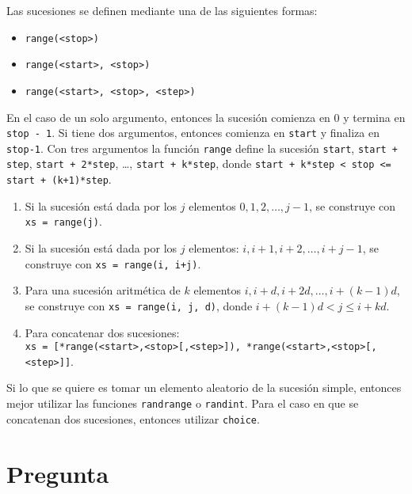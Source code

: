 \documentclass[12pt]{article}
\theoremstyle{definition}
\begin{document}
Las sucesiones se definen mediante una de las siguientes formas:
\begin{itemize}
  \item \verb|range(<stop>)|
  \item \verb|range(<start>, <stop>)|
  \item \verb|range(<start>, <stop>, <step>)|
\end{itemize}

En el caso de un solo argumento, entonces la sucesión comienza en 0 y termina en \verb|stop - 1|. Si tiene dos argumentos, entonces comienza en \verb|start| y finaliza en \verb|stop-1|. Con tres argumentos la función \verb|range| define la sucesión \verb|start|, \verb|start + step|, \verb|start + 2*step|, \dots, \verb|start + k*step|, donde \verb|start + k*step < stop <= start + (k+1)*step|.

\begin{enumerate}
  \item Si la sucesión está dada por los $j$ elementos $0, 1, 2, \dots, j - 1$, se construye con \verb|xs = range(j)|.
  \item Si la sucesión está dada por los $j$ elementos: $i, i+1, i+2, \dots, i + j - 1$, se construye con \verb|xs = range(i, i+j)|.
  \item Para una sucesión aritmética de $k$ elementos $i, i + d, i + 2d, \dots, i + (k-1)d$, se construye con \verb|xs = range(i, j, d)|, donde $i + (k-1)d < j \leq i + kd$.
  \item Para concatenar dos sucesiones:\\[1ex]
    \verb|xs = [*range(<start>,<stop>[,<step>]), *range(<start>,<stop>[,<step>]]|.
\end{enumerate}

Si lo que se quiere es tomar un elemento aleatorio de la sucesión simple, entonces mejor utilizar las funciones \verb|randrange| o \verb|randint|. Para el caso en que se concatenan dos sucesiones, entonces utilizar \verb|choice|.


\section{Pregunta}
\end{document}
